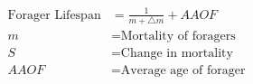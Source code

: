 \documentclass[varwidth=true, border=2pt]{standalone}
\begin{document}
\begin{align*}
\text{Forager Lifespan} & = \frac{1}{m + \bigtriangleup m} + AAOF\nonumber \\
m & =  \text{Mortality of foragers} \nonumber \\
S & =  \text{Change in mortality} \nonumber \\
AAOF & =  \text{Average age of forager} \nonumber \\
\end{align*} 
\end{document}
